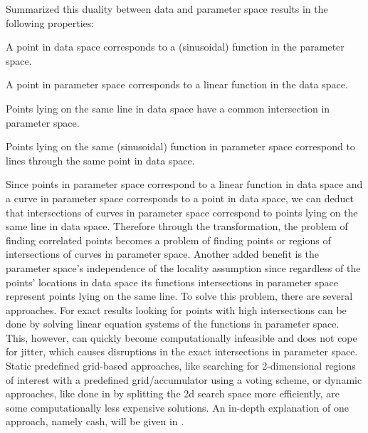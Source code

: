 Summarized this duality between data and parameter space results in the following properties:\label{ssec:properties}
\begin{property}\label{prop:hough1}
A point in data space corresponds to a (sinusoidal) function in the parameter space. 
\end{property}
\begin{property}\label{prop:hough2}
A point in parameter space corresponds to a linear function in the data space.
\end{property}
\begin{property}\label{prop:hough3}
Points lying on the same line in data space have a common intersection in parameter space.
\end{property}
\begin{property}\label{prop:hough4}
Points lying on the same (sinusoidal) function in parameter space correspond to lines through the same point in data space.
\end{property}

Since points in parameter space correspond to a linear function in data space and a curve in parameter space corresponds to a point in data space, we can deduct that intersections of curves in parameter space correspond to points lying on the same line in data space. Therefore through the transformation, the problem of finding correlated points becomes a problem of finding points or regions of intersections of curves in parameter space. Another added benefit is the parameter space's independence of the locality assumption since regardless of the points' locations in data space its functions intersections in parameter space represent points lying on the same line.  To solve this problem, there are several approaches. For exact results looking for points with high intersections can be done by solving linear equation systems of the functions in parameter space. This, however, can quickly become computationally infeasible and does not cope for jitter, which causes disruptions in the exact intersections in parameter space. Static predefined grid-based approaches, like searching for 2-dimensional regions of interest with a predefined grid/accumulator using a voting scheme, or dynamic approaches, like done in \textcite{CASHachtert2008global} by splitting the 2d search space more efficiently, are some computationally less expensive solutions. An in-depth explanation of one approach, namely \acrfull{cash}, will be given in .

